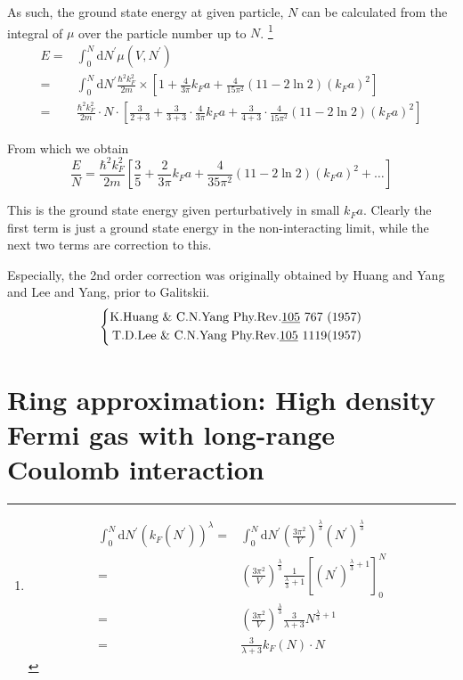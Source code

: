 As such, the ground state energy at given particle, $N$ can be calculated from the integral of $\mu$ over the particle number up to $N$.
\footnote{ \[ \begin{split} \int_0^N \mathrm{d}N^{'}(k_F(N^{'}))^\lambda =& \int_0^N \mathrm{d}N^{'}\left( \frac{3\pi^2}{V} \right)^{\frac{\lambda}{3}}(N^{'})^{\frac{\lambda}{3}}\\
=& \left( \frac{3\pi^2}{V} \right)^{\frac{\lambda}{3}} \frac{1}{\frac{\lambda}{3}+1}\left[ (N^{'})^{\frac{\lambda}{3}+1} \right]_0^N\\
=&\left( \frac{3\pi^2}{V} \right)^{\frac{\lambda}{3}} \frac{3}{\lambda+3}N^{\frac{\lambda}{3}+1}\\
=&\frac{3}{\lambda +3} k_F(N) \cdot N
\end{split} \]}
\[ \begin{split}
E=& \int_0^N \mathrm{d}N^{'} \mu(V,N^{'})\\
=&\int_0^N \mathrm{d}N^{'}\frac{\hbar^2 k_F^2}{2m} \times \left[ 1+\frac{4}{3\pi}k_F a + \frac{4}{15\pi^2}(11-2 \ln2)(k_F a)^2 \right]\\
=&\frac{\hbar^2 k_F^2}{2m}\cdot N\cdot \left[ \frac{3}{2+3} + \frac{3}{3+3}\cdot\frac{4}{3\pi}k_F a + \frac{3}{4+3}\cdot\frac{4}{15\pi^2}(11-2 \ln2)(k_F a)^2 \right]
\end{split}\]

From which we obtain
\begin{equation} \label{Eqs2.7.41}
\frac{E}{N} = \frac{\hbar^2 k_F^2}{2m}\left[ \frac{3}{5}+\frac{2}{3\pi}k_F a + \frac{4}{35\pi^2}(11-2 \ln2)(k_F a)^2 + \ldots \right]
\end{equation}

This is the ground state energy given perturbatively in small $k_F a$. Clearly the first term is just a ground state energy in the non-interacting limit, while the next two terms are correction to this.

Especially, the 2nd order correction was originally obtained by Huang and Yang and Lee and Yang, prior to Galitskii.
\[ \left\{ \begin{aligned}
\text{K.Huang \& C.N.Yang Phy.Rev.\underline{105} 767 (1957)}\\
\text{T.D.Lee \& C.N.Yang Phy.Rev.\underline{105} 1119(1957)}
\end{aligned} \right. \]

\section[Ring approximation for the electron gas]{Ring approximation: High density Fermi gas with long-range Coulomb interaction}%

